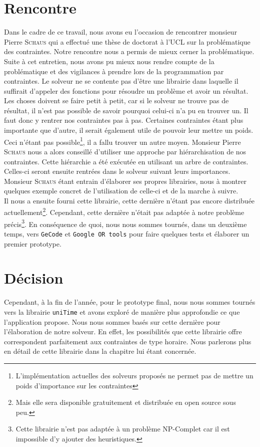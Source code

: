 \section{Rencontre}
Dans le cadre de ce travail, nous avons eu l'occasion de rencontrer monsieur Pierre \textsc{Schaus} qui a effectué une thèse de doctorat à l'UCL sur la problématique des contraintes. Notre rencontre nous a permis de mieux cerner la problématique.
\newline
\indent
Suite à cet entretien, nous avons pu mieux nous rendre compte de la problématique et des vigilances à prendre lors de la programmation par contraintes. Le solveur ne se contente pas d'être une librairie dans laquelle il suffirait d'appeler des fonctions pour résoudre un problème et avoir un résultat. Les choses doivent se faire petit à petit, car si le solveur ne trouve pas de résultat, il n'est pas possible de savoir pourquoi celui-ci n'a pu en trouver un. 
\newline
\indent
Il faut donc y rentrer nos contraintes pas à pas. Certaines contraintes étant plus importante que d'autre, il serait également utile de pouvoir leur mettre un poids. Ceci n'étant pas possible\footnote{L'implémentation actuelles des solveurs proposés ne permet pas de mettre un poids d'importance sur les contraintes}, il a fallu trouver un autre moyen. Monsieur Pierre \textsc{Schaus} nous a alors conseillé d'utiliser une approche par hiérarchisation de nos contraintes. Cette hiérarchie a été exécutée en utilisant un arbre de contraintes. Celles-ci seront ensuite rentrées dans le solveur suivant leurs importances. Monsieur \textsc{Schaus} étant entrain d'élaborer ses propres librairies, nous à montrer quelques exemple concret de l'utilisation de celle-ci et de la marche à suivre.\\
\newline
\indent
Il nous a ensuite fourni cette librairie, cette dernière n'étant pas encore distribuée actuellement\footnote{Mais elle sera disponible gratuitement et distribuée en open source sous peu.}. Cependant, cette dernière n'était pas adaptée à notre problème précis\footnote{Cette librairie n'est pas adaptée à un problème NP-Complet car il est impossible d'y ajouter des heuristiques.}. En conséquence de quoi, nous nous sommes tournés, dans un deuxième temps, vers  \texttt{GeCode} et \texttt{Google OR tools} pour faire quelques tests et élaborer un premier prototype.

\section{Décision}

Cependant, à la fin de l'année, pour le prototype final, nous nous sommes tournés vers la librairie \texttt{uniTime} et avons exploré de manière plus approfondie ce que l'application propose. Nous nous sommes basés sur cette dernière pour l'élaboration de notre solveur. En effet, les possibilités que cette librairie offre correspondent parfaitement aux contraintes de type horaire. Nous parlerons plus en détail de cette librairie dans la chapitre lui étant concernée.



